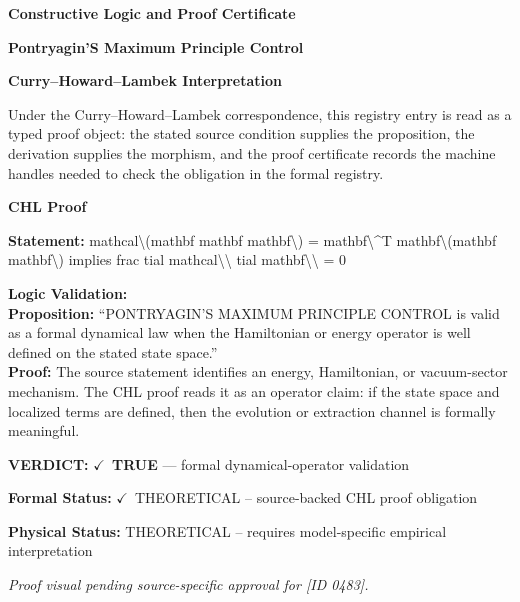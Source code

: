 \clearpage
\begingroup\tzpsupportsetup
\noindent\textbf{\fontsize{10.8pt}{12.8pt}\selectfont [ID 0483] Constructive Logic and Proof Certificate}\par
\noindent\textbf{\fontsize{10pt}{12pt}\selectfont Pontryagin'S Maximum Principle Control}\par
\vspace{0.45em}
\begingroup
\footnotesize
\setlength{\parskip}{0.22em}
\setlength{\parindent}{0pt}
\noindent\textbf{Curry--Howard--Lambek Interpretation}\par
Under the Curry--Howard--Lambek correspondence, this registry entry is read as a typed proof
object: the stated source condition supplies the proposition, the derivation supplies the
morphism, and the proof certificate records the machine handles needed to check the obligation
in the formal registry.

\vspace{0.45em}
\noindent\textbf{CHL Proof}\par
\textbf{Statement:} mathcal\textbackslash{}(mathbf mathbf mathbf\textbackslash{}) = mathbf\textbackslash{}\textasciicircum{}T mathbf\textbackslash{}(mathbf mathbf\textbackslash{}) implies frac tial
mathcal\textbackslash{}\textbackslash{} tial mathbf\textbackslash{}\textbackslash{} = 0

\textbf{Logic Validation:}\\
\textbf{Proposition:} ``PONTRYAGIN'S MAXIMUM PRINCIPLE CONTROL is valid as a formal dynamical law when the
Hamiltonian or energy operator is well defined on the stated state space.''\\
\textbf{Proof:} The source statement identifies an energy, Hamiltonian, or vacuum-sector mechanism. The
CHL proof reads it as an operator claim: if the state space and localized terms are
defined, then the evolution or extraction channel is formally meaningful.

\textbf{VERDICT:} \ensuremath{\checkmark}\ \textbf{TRUE} --- formal dynamical-operator validation

\textbf{Formal Status:} \ensuremath{\checkmark}\ THEORETICAL -- source-backed CHL proof obligation

\textbf{Physical Status:} THEORETICAL -- requires model-specific empirical interpretation
\par\vspace{0.45em}
\par
\vfill
\begingroup\footnotesize\itshape
Proof visual pending source-specific approval for [ID 0483].
\par\endgroup
\vfill
\endgroup
\endgroup
